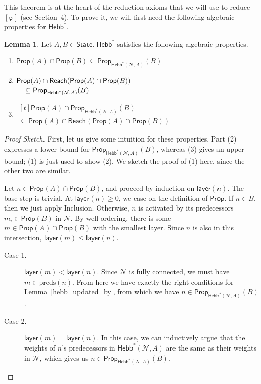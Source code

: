 \documentclass[letterpaper]{article}
\theoremstyle{definition}
\newtheorem{lemma}[theorem]{Lemma}
\newenvironment{sketch}{\begin{proof}[Proof Sketch]}{\end{proof}}
\newcommand{\State}{\mathsf{State}}
\newcommand{\preds}[1]{\mbox{preds}(#1)}
\newcommand{\layer}[1]{\mathsf{layer}(#1)}
\newcommand{\Net}{\mathcal{N}}
\newcommand{\Prop}{\mathsf{Prop}}
\newcommand{\Reach}{\mathsf{Reach}}
\newcommand{\Hebbstar}[2]{\mathsf{Hebb}^*(#1, #2)}
\newcommand{\HebbstarNoArgs}{\mathsf{Hebb}^*}
\newcommand{\Hebbop}[1]{[#1]}
\begin{document}
This theorem is at the heart of the reduction axioms that we will use to reduce $\Hebbop{\varphi}$ (see Section~4).  To prove it, we will first need the following algebraic properties for $\HebbstarNoArgs$.
\begin{lemma}\label{hebb_properties}
    Let $A, B \in \State$.  $\HebbstarNoArgs$ satisfies the following algebraic properties.
    \begin{enumerate}
        \item $\Prop(A) \cap \Prop(B) \subseteq \Prop_{\Hebbstar{\Net}{A}}(B)$
        \item $\begin{multlined}[t]
            \Prop(A) \cap \Reach(\Prop(A) \cap \Prop(B)) \\
            \subseteq \Prop_{\Hebbstar{\Net}{A}}(B) \hfill
        \end{multlined}$
        \item $\begin{multlined}[t]
            \Prop(A) \cap \Prop_{\Hebbstar{\Net}{A}}(B)\\
            \subseteq \Prop(A) \cap \Reach(\Prop(A) \cap \Prop(B))
        \end{multlined}$
    \end{enumerate}
\end{lemma}
\begin{sketch}
    First, let us give some intuition for these properties.  Part (2) expresses a lower bound for $\Prop_{\Hebbstar{\Net}{A}}(B)$, whereas (3) gives an upper bound; (1) is just used to show (2).  We sketch the proof of (1) here, since the other two are similar.

    Let $n \in \Prop(A) \cap \Prop(B)$, and proceed by induction on $\layer{n}$.  The base step is trivial.  At $\layer{n} \geq 0$, we case on the definition of $\Prop$. If $n \in B$, then we just apply Inclusion.  Otherwise, $n$ is activated by its predecessors $m_i \in \Prop(B)$ in $\Net$.  By well-ordering, there is some $m \in \Prop(A) \cap \Prop(B)$ with the smallest layer.  Since $n$ is also in this intersection, $\layer{m} \leq \layer{n}$.
        \begin{description}
            \item[Case 1.] $\layer{m} < \layer{n}$.  Since $\Net$ is fully connected, we must have $m \in \preds{n}$.  From here we have exactly the right conditions for Lemma~\ref{hebb_updated_by}, from which we have $n \in \Prop_{\Hebbstar{\Net}{A}}(B)$.
            \item[Case 2.] $\layer{m} = \layer{n}$. In this case, we can inductively argue that the weights of $n$'s predecessors in $\Hebbstar{\Net}{A}$ are the same as their weights in $\Net$, which gives us $n \in \Prop_{\Hebbstar{\Net}{A}}(B)$.\qedhere
        \end{description}
\end{sketch}
\end{document}
